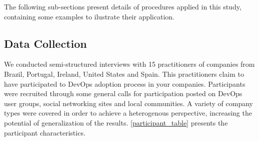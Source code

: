 The following sub-sections present details of procedures applied in this study,
containing some examples to ilustrate their application.

\subsection{Data Collection}
We conducted semi-structured interviews with 15 practitioners of companies from
Brazil, Portugal, Ireland, United States and Spain. This practitioners claim
to have participated to DevOps adoption process in your companies. Participants
were recruited through some general calls for participation posted on DevOps
user groups, social networking sites and local communities. A variety of
company types were covered in order to achieve a heterogenous perspective,
increasing the potential of generalization of the results.
\ref{participant_table} presents the participant characteristics.


